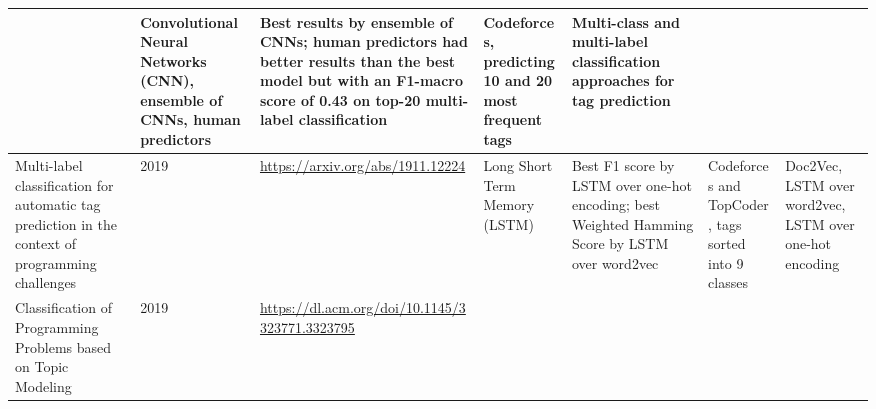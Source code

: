 \documentclass{article}
\begin{document}
\begin{itemize}
\begin{longtable}{|p{2cm}|p{0.8cm}|p{2cm}|p{2cm}|p{3cm}|p{2cm}|p{3cm}|}
              
              
              
              
                             & Convolutional Neural Networks (CNN), ensemble of CNNs, human predictors 
                             & Best results by ensemble of CNNs; human predictors had better results than the best model but with an F1-macro score of 0.43 on top-20 multi-label classification 
                             & Codeforces, predicting 10 and 20 most frequent tags 
                             & Multi-class and multi-label classification approaches for tag prediction                                                                                                                                                                                       \\
              
              \hline
              Multi-label classification for automatic tag prediction in the context of programming challenges
                             & 2019
                             & \href{https://arxiv.org/abs/1911.12224}{\url{https://arxiv.org/abs/1911.12224}}

              
              
              
              
              
              
                             & Long Short Term Memory (LSTM)
                             & Best F1 score by LSTM over one-hot encoding; best Weighted Hamming Score by LSTM over word2vec 
                             & Codeforces and TopCoder, tags sorted into 9 classes 
                             & Doc2Vec, LSTM over word2vec, LSTM over one-hot encoding                                                                                                                                                                                                        \\
              
              \hline
              Classification of Programming Problems based on Topic Modeling
                             & 2019
                             & \href{https://dl.acm.org/doi/10.1145/3323771.3323795}{\url{https://dl.acm.org/doi/10.1145/3323771.3323795}}

              
              
              
              
              
              

\end{longtable}
\end{itemize}
\end{document}
